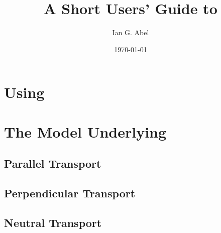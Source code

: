 \documentclass{revtex4}
\begin{document}
\date{\today}

\title{A Short Users' Guide to \mctrans}
\author{Ian G. Abel}


\maketitle
\section{Using \mctrans}


\section{The Model Underlying \mctrans}
\subsection{Parallel Transport}
\subsection{Perpendicular Transport}
\subsection{Neutral Transport}

\appendix
\end{document}
